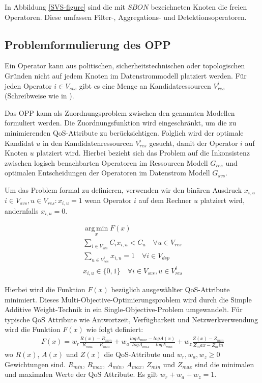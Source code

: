 \documentclass{article}
\begin{document}
In Abbildung \ref{SVS-figure} sind die mit $SBON$ bezeichneten Knoten die freien Operatoren. Diese umfassen Filter-, Aggregations- und Detektionsoperatoren.

\subsection{Problemformulierung des OPP} \label{OPP-Definition}
Ein Operator kann aus politischen, sicherheitstechnischen oder topologischen Gründen \cite{cardellini-optimal_operatorplc} nicht auf jedem Knoten im Datenstrommodell platziert werden. 
Für jeden Operator $i \in V_{svs}$ gibt es eine Menge an Kandidatressourcen $V_{res}^i$ (Schreibweise wie in \cite{efficient-operator-placement}).

Das OPP kann als Zuordnungsproblem zwischen den genannten Modellen formuliert werden. 
Die Zuordnungsfunktion wird eingeschränkt, um die zu minimierenden QoS-Attribute zu berücksichtigen. 
Folglich wird der optimale Kandidat $u$ in den Kandidatenressourcen $V_{res}^i$
gesucht, damit der Operator $i$ auf Knoten $u$ platziert wird.
Hierbei bezieht sich das Problem auf die Inkonsistenz zwischen 
logisch benachbarten Operatoren im Ressourcen Modell $G_{res}$ und optimalen Entscheidungen der Operatoren im Datenstrom Modell $G_{svs}$.

Um das Problem formal zu definieren, verwenden wir den binären Ausdruck $x_{i,u}$ $i \in V_{svs}, u \in V_{res}: x_{i,u} = 1$ wenn Operator $i$
auf dem Rechner $u$ platziert wird, andernfalls $x_{i,u} = 0$.

\[ 
    \begin{gathered}
        \operatorname*{arg\,min}_x F(x) \\
        \sum_{i \in V_{svs}} C_i x_{i,u} < C_u \quad \forall u \in V_{res} \\ %
        \sum_{u \in V_{res}^i} x_{i,u} = 1 \quad \forall i \in V_{dsp} \\ %
        x_{i,u} \in \{0,1\} \quad \forall i \in V_{svs}, u \in V_{res}^i
    \end{gathered}
\] 

Hierbei wird die Funktion $F(x)$ bezüglich ausgewählter QoS-Attribute minimiert. 
Dieses Multi-Objective-Optimierungsproblem wird durch die Simple Additive Weight-Technik \cite{yoon-multiple-optimization} in ein Single-Objective-Problem umgewandelt.
Für typische QoS Attribute wie Antwortzeit, Verfügbarkeit und Netzwerkverwendung \cite{efficient-operator-placement} wird die Funktion $F(x)$ wie folgt definiert:
\[ 
    \begin{gathered}
        F(x) = w_r \frac{R(x) - R_{min}}{R_{max} - R_{min}} 
        + w_a \frac{log A_{max} - log A(x)}{log A_{max} - log A_{min}} 
        + w_z \frac{Z(x) - Z_{min}}{Z_max - Z_min} 
    \end{gathered}  \label{to-miminize-function}
\] 
wo $R(x)$, $A(x)$ und $Z(x)$ die QoS-Attribute und $w_r, w_a, w_z \geq 0$ Gewichtungen sind. $R_{min}$, $R_{max}$, $A_{min}$, $A_{max}$, $Z_{min}$ und $Z_{max}$ sind die minimalen und maximalen Werte der QoS Attribute.
Es gilt $w_r + w_a + w_z = 1$.
\end{document}
